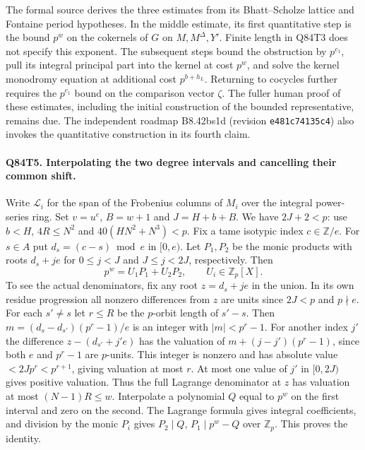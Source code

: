 The formal source derives the three estimates from its
Bhatt--Scholze lattice and Fontaine period hypotheses. In the
middle estimate, its first quantitative step is the bound $p^w$ on
the cokernels of $G$ on $M,M^\Delta,Y'$. Finite length in Q84T3
does not specify this exponent. The subsequent steps bound the
obstruction by $p^{c_1}$, pull its integral principal part into
the kernel at cost $p^w$, and solve the kernel monodromy equation
at additional cost $p^{b+h_L}$. Returning to cocycles further
requires the $p^{c_1}$ bound on the comparison vector $\zeta$.
The fuller human proof of these estimates, including the initial
construction of the bounded representative, remains due. The
independent roadmap B8.42bs1d (revision \texttt{e481c74135c4})
also invokes the quantitative construction in its fourth claim.

\paragraph{Q84T5. Interpolating the two degree intervals and cancelling their common shift.}
Write $\mathcal L_i$ for the span of the Frobenius columns of $M_i$
over the integral power-series ring. Set $v=u^e$, $B=w+1$ and
$J=H+b+B$. We have $2J+2<p$: use $b<H$, $4R\le N^2$ and
$40(HN^2+N^3)<p$. Fix a tame isotypic index $c\in\mathbb Z/e$.
For $s\in A$ put $d_s=(c-s)\bmod e$ in $[0,e)$. Let $P_1,P_2$
be the monic products with roots $d_s+je$ for $0\le j<J$ and
$J\le j<2J$, respectively. Then
\[
         p^w=U_1 P_1+U_2 P_2,\qquad U_i\in\mathbb Z_p[X].
\]
To see the actual denominators, fix any root $z=d_s+je$ in the union.
In its own residue progression all nonzero differences from $z$ are
units since $2J<p$ and $p\nmid e$. For each $s'\ne s$ let $r\le R$
be the $p$-orbit length of $s'-s$. Then
$m=(d_s-d_{s'})(p^r-1)/e$ is an integer with $|m|<p^r-1$.
For another index $j'$ the difference $z-(d_{s'}+j'e)$ has
the valuation of $m+(j-j')(p^r-1)$, since both $e$ and $p^r-1$
are $p$-units. This integer is nonzero and has absolute value
$<2Jp^r<p^{r+1}$, giving valuation at most $r$. At most one value
of $j'$ in $[0,2J)$ gives positive valuation. Thus the full
Lagrange denominator at $z$ has valuation at most $(N-1)R\le w$.
Interpolate a polynomial $Q$ equal to $p^w$ on the first interval
and zero on the second. The Lagrange formula gives integral
coefficients, and division by the monic $P_i$ gives $P_2\mid Q$,
$P_1\mid p^w-Q$ over $\mathbb Z_p$. This proves the identity.

